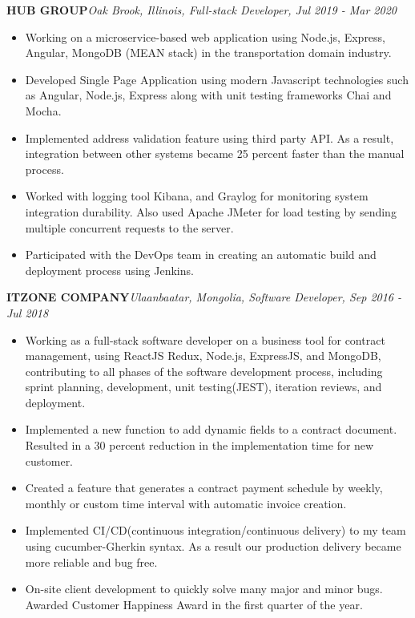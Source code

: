 \documentclass[letterpaper,11pt]{article}
\newcommand{\resumeItemListStart}{\begin{itemize}}
\newcommand{\resumeItemListEnd}{\end{itemize}\vspace{-5pt}}
\begin{document}
      \vfill
      \textbf{HUB GROUP}\hfill \textit{Oak Brook, Illinois, Full-stack Developer, Jul 2019 - Mar 2020}
      \resumeItemListStart
        \item{
          Working on a microservice-based web application using Node.js, Express, Angular, MongoDB (MEAN stack) in the transportation domain industry.
        }
        \item{
          Developed Single Page Application using modern Javascript technologies such as Angular, Node.js, Express along with unit testing frameworks Chai and Mocha. 
        }
        \item{
          Implemented address validation feature using third party API. As a result, integration between other systems became 25 percent faster than the manual process.
        }
        \item{
          Worked with logging tool Kibana, and Graylog for monitoring system integration durability. Also used Apache JMeter for load testing by sending multiple concurrent requests to the server.
        }
        \item{
          Participated with the DevOps team in creating an automatic build and deployment process using Jenkins. 
        }
      \resumeItemListEnd

      \vfill
      \textbf{ITZONE COMPANY}\hfill \textit{Ulaanbaatar, Mongolia, Software Developer, Sep 2016 - Jul 2018}
      \resumeItemListStart
        \item{
          Working as a full-stack software developer on a business tool for contract management, using ReactJS
          Redux, Node.js, ExpressJS, and MongoDB, contributing to all phases of the software development
          process, including sprint planning, development, unit testing(JEST), iteration reviews, and deployment.
        }
        \item{
          Implemented a new function to add dynamic fields to a contract document. Resulted in a 30 percent
          reduction in the implementation time for new customer.
        }
        \item{
          Created a feature that generates a contract payment schedule by weekly, monthly or custom time
          interval with automatic invoice creation.
        }
        \item{
          Implemented CI/CD(continuous integration/continuous delivery) to my team using cucumber-Gherkin
          syntax. As a result our production delivery became more reliable and bug free.
        }
        \item{
          On-site client development to quickly solve many major and minor bugs. Awarded Customer Happiness Award in the first quarter of the year.
        }
      \resumeItemListEnd
  
\end{document}

